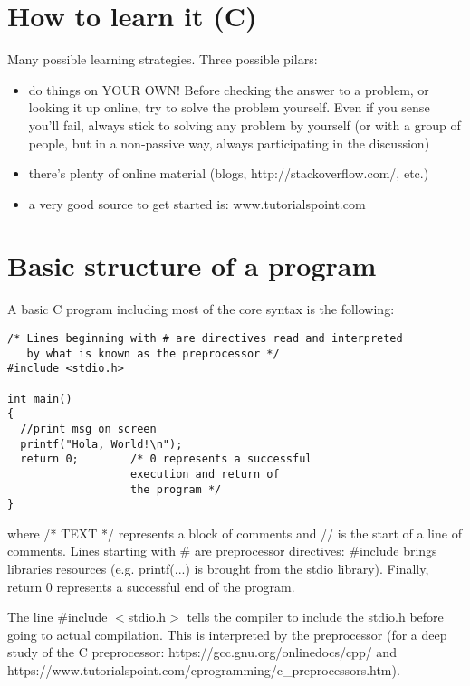 \documentclass[11pt]{article}
\begin{document}
\section{How to learn it (C)}


Many possible learning strategies. Three possible pilars:



\begin{itemize}
\item do things on YOUR OWN! Before checking the answer to a problem, or looking it up online, try to solve the problem yourself. Even if you sense you'll fail, always stick to solving any problem by yourself (or with a group of people, but in a non-passive way, always participating in the discussion)
\item there's plenty of online material (blogs, http://stackoverflow.com/, etc.)
\item a very good source to get started is: www.tutorialspoint.com
\end{itemize}



\section{Basic structure of a program}

A basic C program including most of the core syntax is the following:

\begin{lstlisting}
/* Lines beginning with # are directives read and interpreted
   by what is known as the preprocessor */
#include <stdio.h>

int main()
{
  //print msg on screen
  printf("Hola, World!\n");
  return 0;        /* 0 represents a successful
                   execution and return of
                   the program */
}
\end{lstlisting}


where /* TEXT */ represents a block of comments and // is the start of a line of comments. Lines starting with \# are preprocessor directives: \#include brings libraries resources (e.g. printf(...) is brought from the stdio library). Finally, return 0 represents a successful end of the program.

The line \#include $<$stdio.h$>$ tells the compiler to include the stdio.h before going to actual compilation. This is interpreted by the preprocessor (for a deep study of the C preprocessor: https://gcc.gnu.org/onlinedocs/cpp/ and https://www.tutorialspoint.com/cprogramming/c\_preprocessors.htm).
\end{document}
